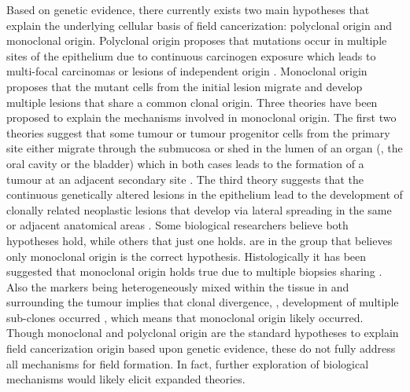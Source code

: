 \documentclass[\main/thesis.tex]{subfiles}
\begin{document}
Based on genetic evidence, there currently exists two main hypotheses that explain the underlying cellular basis of field cancerization: polyclonal origin and monoclonal origin. Polyclonal origin proposes that mutations occur in multiple sites of the epithelium due to continuous carcinogen exposure which leads to multi-focal carcinomas or lesions of independent origin \parencite{VanOijen}. Monoclonal origin proposes that the mutant cells from the initial lesion migrate and develop multiple lesions that share a common clonal origin. Three theories have been proposed to explain the mechanisms involved in monoclonal origin. The first two theories suggest that some tumour or tumour progenitor cells from the primary site either migrate through the submucosa or shed in the lumen of an organ (\eg, the oral cavity or the bladder) which in both cases leads to the formation of a tumour at an adjacent secondary site \parencite{Califano1999,Bedi}. The third theory suggests that the continuous genetically altered lesions in the epithelium lead to the development of clonally related neoplastic lesions that develop via lateral spreading in the same or adjacent anatomical areas \parencite{Angadi,Prevo,Tabor2002,Simon}. Some biological researchers believe both hypotheses hold, while others that just one holds. \textcite{Braakhuis} are in the group that believes only monoclonal origin is the correct hypothesis. Histologically it has been suggested that monoclonal origin holds true due to multiple biopsies sharing  \parencite{VanHouten,Califano1999,Tabor122001}. Also the  markers being heterogeneously mixed within the tissue in and surrounding the tumour implies that clonal divergence, \ie, development of multiple sub-clones occurred \parencite{Nowell}, which means that monoclonal origin likely occurred. Though monoclonal and polyclonal origin are the standard hypotheses to explain field cancerization origin based upon genetic evidence, these do not fully address all mechanisms for field formation. In fact, further exploration of biological mechanisms would likely elicit expanded theories. 
\end{document}
